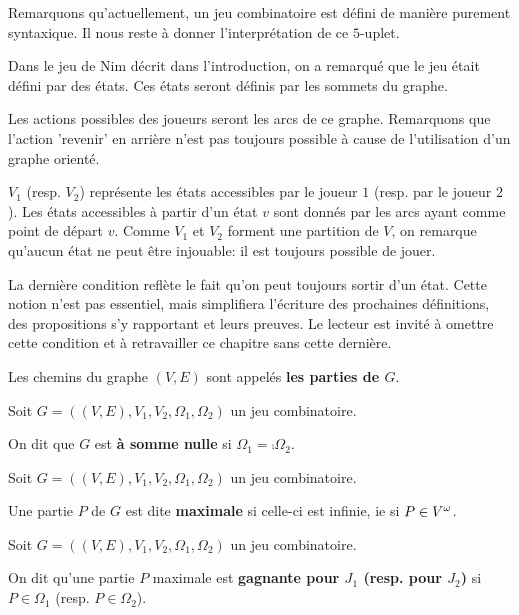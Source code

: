 \documentclass[a4paper, 11pt]{report}
\begin{document}
Remarquons qu'actuellement, un jeu combinatoire est défini de manière purement
syntaxique. Il nous reste à donner l'interprétation de ce $5$-uplet.

Dans le jeu de Nim décrit dans l'introduction, on a remarqué que le jeu était
défini par des états. Ces états seront définis par les sommets du graphe.

Les actions possibles des joueurs seront les arcs de ce graphe. Remarquons que
l'action 'revenir' en arrière n'est pas toujours possible à cause de
l'utilisation d'un graphe orienté.

$V_{1}$ (resp. $V_{2}$) représente les états accessibles par le joueur $1$
(resp. par le joueur $2$). Les états accessibles à partir d'un état $v$ sont
donnés par les arcs ayant comme point de départ $v$. Comme $V_{1}$ et $V_{2}$
forment une partition de $V$, on remarque qu'aucun état ne peut être injouable:
il est toujours possible de jouer.

La dernière condition reflète le fait qu'on peut toujours sortir d'un état.
Cette notion n'est pas essentiel, mais simplifiera l'écriture des prochaines
définitions, des propositions s'y rapportant et leurs preuves. Le lecteur est
invité à omettre cette condition et à retravailler ce chapitre sans cette
dernière.

Les chemins du graphe $(V, E)$ sont appelés \textbf{les parties de $G$}.

\begin{definition} 
	Soit $G = ( (V, E), V_{1}, V_{2}, \Omega_{1}, \Omega_{2})$ un jeu
	combinatoire.

	On dit que $G$ est \textbf{à somme nulle} si $\Omega_{1} =
	\comp{\Omega_{2}}$.
\end{definition}

\begin{definition} 
	Soit $G = ( (V, E), V_{1}, V_{2}, \Omega_{1}, \Omega_{2})$ un jeu
	combinatoire.

	Une partie $P$ de $G$ est dite \textbf{maximale} si celle-ci est infinie, ie
	si $P \in V^{\omega}$.
\end{definition}

\begin{definition} 
	Soit $G = ( (V, E), V_{1}, V_{2}, \Omega_{1}, \Omega_{2})$ un jeu
	combinatoire.

	On dit qu'une partie $P$ maximale est \textbf{gagnante pour $J_{1}$ (resp.
	pour $J_{2}$)} si $P \in \Omega_{1}$ (resp. $P \in \Omega_{2}$).
\end{definition}
\end{document}
